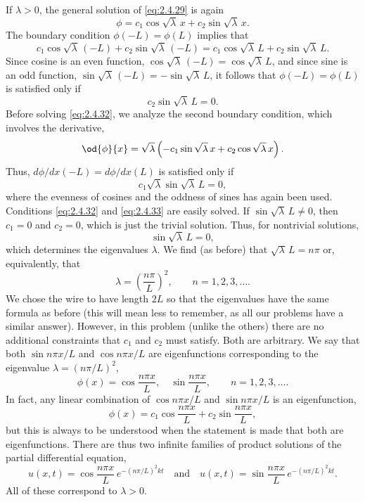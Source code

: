 If $\lambda > 0$, the general solution of \eqref{eq:2.4.29} is again
\[
\phi = c_1\cos\sqrt{\lambda}\,x + c_2\sin\sqrt{\lambda}\,x.
\]
The boundary condition $\phi(-L) = \phi(L)$ implies that
\[
c_1\cos\sqrt{\lambda}\,(-L) + c_2\sin\sqrt{\lambda}\,(-L) = c_1\cos\sqrt{\lambda}\,L + c_2\sin\sqrt{\lambda}\,L.
\]
Since cosine is an even function, $\cos\sqrt{\lambda}\,(-L) = \cos\sqrt{\lambda}\,L$, and since sine is an odd function, $\sin\sqrt{\lambda}\,(-L) = -\sin\sqrt{\lambda}\,L$, it follows that $\phi(-L) = \phi(L)$ is satisfied only if
\begin{equation}
\label{eq:2.4.32}
c_2\sin\sqrt{\lambda}\,L = 0.
\end{equation}
Before solving \eqref{eq:2.4.32}, we analyze the second boundary condition, which involves the derivative,
\[
\od{\phi}{x} = \sqrt{\lambda}\left(-c_1\sin\sqrt{\lambda}\,x + c_2\cos\sqrt{\lambda}\,x\right).
\]
Thus, $d\phi/dx(-L) = d\phi/dx(L)$ is satisfied only if
\begin{equation}
\label{eq:2.4.33}
c_1\sqrt{\lambda}\sin\sqrt{\lambda}\,L = 0,
\end{equation}
where the evenness of cosines and the oddness of sines has again been used. Conditions \eqref{eq:2.4.32} and \eqref{eq:2.4.33} are easily solved. If $\sin\sqrt{\lambda}\,L \ne 0$, then $c_1 = 0$ and $c_2 = 0$, which is just the trivial solution. Thus, for nontrivial solutions,
\[
\sin\sqrt{\lambda}\,L = 0,
\]
which determines the eigenvalues $\lambda$. We find (as before) that $\sqrt{\lambda}\,L = n\pi$ or, equivalently, that
\begin{equation}
\label{eq:2.4.34}
\lambda = \left(\frac{n\pi}{L}\right)^2, \qquad n = 1, 2, 3, \ldots.
\end{equation}
We chose the wire to have length $2L$ so that the eigenvalues have the same formula as before (this will mean less to remember, as all our problems have a similar answer). However, in this problem (unlike the others) there are no additional constraints that $c_1$ and $c_2$ must satisfy. Both are arbitrary. We say that both $\sin n\pi x/L$ and $\cos n\pi x/L$ are eigenfunctions corresponding to the eigenvalue $\lambda = (n\pi/L)^2$,
\begin{equation}
\label{eq:2.4.35}
\phi(x) = \cos\frac{n\pi x}{L},\quad \sin\frac{n\pi x}{L}, \qquad n = 1, 2, 3, \ldots.
\end{equation}
In fact, any linear combination of $\cos n\pi x/L$ and $\sin n\pi x/L$ is an eigenfunction,
\begin{equation}
\label{eq:2.4.36}
\phi(x) = c_1\cos\frac{n\pi x}{L} + c_2\sin\frac{n\pi x}{L},
\end{equation}
but this is always to be understood when the statement is made that both are eigenfunctions. There are thus two infinite families of product solutions of the partial differential equation,
\begin{equation}
\label{eq:2.4.37}
u(x,t) = \cos\frac{n\pi x}{L}\,e^{-(n\pi/L)^2 kt} \quad\text{and}\quad u(x,t) = \sin\frac{n\pi x}{L}\,e^{-(n\pi/L)^2 kt}.
\end{equation}
All of these correspond to $\lambda > 0$.

